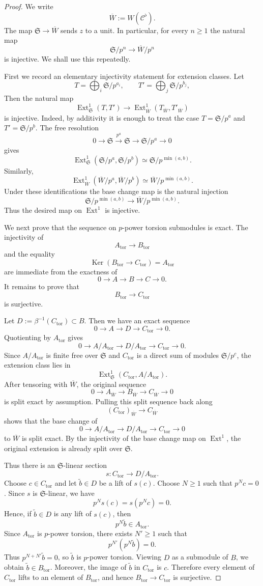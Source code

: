 \documentclass[10pt,a4paper]{amsart}
\newcommand{\Ext}{\operatorname{Ext}}
\newcommand{\Ker}{\operatorname{Ker}}
\newcommand{\mS}{\mf{S}}
\newcommand{\mf}{\mathfrak}
\newcommand{\ol}{\overline}
\newcommand{\sC}{\mathcal{C}}
\newcommand{\tors}{\operatorname{tor}}
\begin{document}
\begin{proof}
We write
\[
  \ol{W}:=W(\sC^\flat).
\]
The map $\mS\to \ol{W}$ sends $z$ to a unit.  In particular, for every $n\geq 1$
the natural map
\[
  \mS/p^n\longrightarrow \ol{W}/p^n
\]
is injective.  We shall use this repeatedly.

First we record an elementary injectivity statement for extension classes.
Let
\[
  T=\bigoplus_i \mS/p^{a_i},
  \qquad
  T'=\bigoplus_j \mS/p^{b_j},
\]
Then the natural map
\[
  \Ext^1_{\mS}(T,T')
  \longrightarrow
  \Ext^1_{\ol{W}}(T_{\ol{W}},T'_{\ol{W}})
\]
is injective.  Indeed, by additivity it is enough to treat the case
$T=\mS/p^a$ and $T'=\mS/p^b$.  The free resolution
\[
  0\longrightarrow \mS
  \xrightarrow{p^a}
  \mS
  \longrightarrow
  \mS/p^a
  \longrightarrow 0
\]
gives
\[
  \Ext^1_{\mS}(\mS/p^a,\mS/p^b)
  \simeq
  \mS/p^{\min(a,b)}.
\]
Similarly,
\[
  \Ext^1_{\ol{W}}({\ol{W}}/p^a,{\ol{W}}/p^b)
  \simeq
  {\ol{W}}/p^{\min(a,b)}.
\]
Under these identifications the base change map is the natural injection
\[
  \mS/p^{\min(a,b)}
  \longrightarrow
  {\ol{W}}/p^{\min(a,b)}.
\]
Thus the desired map on $\Ext^1$ is injective.

We next prove that the sequence on $p$-power torsion submodules is exact.
The injectivity of
\[
  A_{\tors}\longrightarrow B_{\tors}
\]
and the equality
\[
  \Ker(B_{\tors}\to C_{\tors})=A_{\tors}
\]
are immediate from the exactness of
\[
  0\to A\to B\to C\to 0.
\]
It remains to prove that
\[
  B_{\tors}\longrightarrow C_{\tors}
\]
is surjective.

Let $D:=\beta^{-1}(C_{\tors})\subset B$.  Then we have an exact sequence
\[
  0\to A\to D\to C_{\tors}\to 0.
\]
Quotienting by $A_{\tors}$ gives
\[
  0\to A/A_{\tors}
  \longrightarrow
  D/A_{\tors}
  \longrightarrow
  C_{\tors}
  \to 0.
\]
Since $A/A_{\tors}$ is finite free over $\mS$ and $C_{\tors}$ is a direct
sum of modules $\mS/p^c$, the extension class lies in
\[
  \Ext^1_{\mS}(C_{\tors},A/A_{\tors}).
\]
After tensoring with ${\ol{W}}$, the original sequence
\[
  0\to A_{\ol{W}}\to B_{\ol{W}}\to C_{\ol{W}}\to 0
\]
is split exact by assumption.  Pulling this split sequence back along
\[
  (C_{\tors})_{\ol{W}}\longrightarrow C_{\ol{W}}
\]
shows that the base change of
\[
  0\to A/A_{\tors}
  \longrightarrow
  D/A_{\tors}
  \longrightarrow
  C_{\tors}
  \to 0
\]
to ${\ol{W}}$ is split exact.  By the injectivity of the base change map on
$\Ext^1$, the original extension is already split over $\mS$.

Thus there is an $\mS$-linear section
\[
  s:C_{\tors}\longrightarrow D/A_{\tors}.
\]
Choose $c\in C_{\tors}$ and let $\tilde b\in D$ be a lift of $s(c)$. Choose $N\geq 1$ such that $p^N c=0$. Since $s$ is $\mS$-linear, we have
\[
  p^N s(c)=s(p^N c)=0.
\]
Hence, if $\tilde b\in D$ is any lift of $s(c)$, then
\[
  p^N\tilde b\in A_{\tors}.
\]
Since $A_{\tors}$ is $p$-power torsion, there exists $N'\geq 1$ such that
\[
  p^{N'}(p^N\tilde b)=0.
\]
Thus $p^{N+N'}\tilde b=0$, so $\tilde b$ is $p$-power torsion. Viewing
$D$ as a submodule of $B$, we obtain $\tilde b\in B_{\tors}$. Moreover, the image of $\tilde b$ in $C_{\tors}$ is $c$. Therefore every
element of $C_{\tors}$ lifts to an element of $B_{\tors}$, and hence
$B_{\tors}\to C_{\tors}$ is surjective.


\end{proof}
\end{document}
